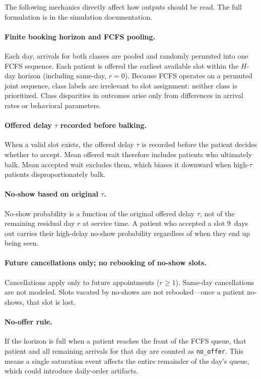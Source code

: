 \documentclass[11pt]{article}
\begin{document}
The following mechanics directly affect how outputs should be read. The full
formulation is in the simulation documentation.

\paragraph{Finite booking horizon and FCFS pooling.}
Each day, arrivals for both classes are pooled and randomly permuted into one
FCFS sequence. Each patient is offered the earliest available slot within the
$H$-day horizon (including same-day, $r=0$). Because FCFS operates on a
permuted joint sequence, class labels are irrelevant to slot assignment:
neither class is prioritized. Class disparities in outcomes arise only from
differences in arrival rates or behavioral parameters.

\paragraph{Offered delay $\tau$ recorded before balking.}
When a valid slot exists, the offered delay $\tau$ is recorded before the
patient decides whether to accept. Mean offered wait therefore includes
patients who ultimately balk. Mean accepted wait excludes them, which biases
it downward when high-$\tau$ patients disproportionately balk.

\paragraph{No-show based on original $\tau$.}
No-show probability is a function of the original offered delay $\tau$, not of
the remaining residual day $r$ at service time. A patient who accepted a slot
9~days out carries their high-delay no-show probability regardless of when they
end up being seen.

\paragraph{Future cancellations only; no rebooking of no-show slots.}
Cancellations apply only to future appointments ($r \geq 1$). Same-day
cancellations are not modeled. Slots vacated by no-shows are not
rebooked---once a patient no-shows, that slot is lost.

\paragraph{No-offer rule.}
If the horizon is full when a patient reaches the front of the FCFS queue,
that patient and all remaining arrivals for that day are counted as
\texttt{no\_offer}. This means a single saturation event affects the entire
remainder of the day's queue, which could introduce daily-order artifacts.
\end{document}
